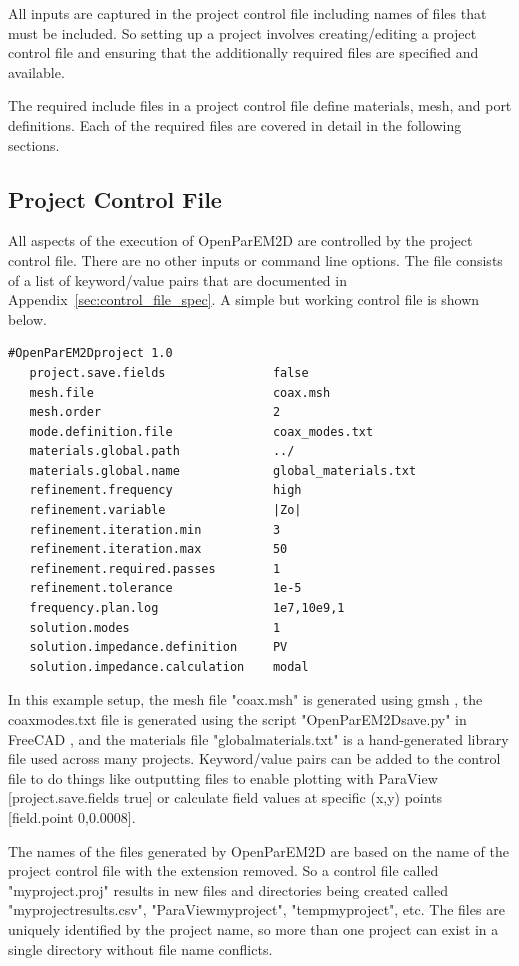 \documentclass[titlepage]{article}
\renewcommand\_{\textunderscore\linebreak[1]}
\begin{document}
All inputs are captured in the project control file including names of files that must be included. So setting up a project involves creating/editing a project control file and ensuring that the additionally required files are specified and available.

The required include files in a project control file define materials, mesh, and port definitions. Each of the required files are covered in detail in the following sections.

\subsection{Project Control File}

All aspects of the execution of OpenParEM2D are controlled by the project control file.  There are no other inputs or command line options.  The file consists of a list of keyword/value pairs that are documented in Appendix~\ref{sec:control_file_spec}.  A simple but working control file is shown below.

\begin{Verbatim}[fontsize=\small]
   #OpenParEM2Dproject 1.0
   project.save.fields               false
   mesh.file                         coax.msh
   mesh.order                        2
   mode.definition.file              coax_modes.txt
   materials.global.path             ../
   materials.global.name             global_materials.txt
   refinement.frequency              high
   refinement.variable               |Zo|
   refinement.iteration.min          3
   refinement.iteration.max          50
   refinement.required.passes        1
   refinement.tolerance              1e-5
   frequency.plan.log                1e7,10e9,1
   solution.modes                    1
   solution.impedance.definition     PV
   solution.impedance.calculation    modal
\end{Verbatim}

\noindent In this example setup, the mesh file "coax.msh" is generated using gmsh \cite{gmsh}\cite{gmshweb}, the coax\_modes.txt file is generated using the script "OpenParEM2D\_save.py" in FreeCAD \cite{FreeCAD}, and the materials file "global\_materials.txt" is a hand-generated library file used across many projects.
Keyword/value pairs can be added to the control file to do things like outputting files to enable plotting with ParaView \cite{ParaView} [project.save.fields true] or calculate field values at specific (x,y) points [field.point 0,0.0008].

The names of the files generated by OpenParEM2D are based on the name of the project control file with the extension removed.  So a control file called "my\_project.proj" results in new files and directories being created called "my\_project\_results.csv", "ParaView\_my\_project", "temp\_my\_project", etc.  The files are uniquely identified by the project name, so more than one project can exist in a single directory without file name conflicts.
\end{document}
